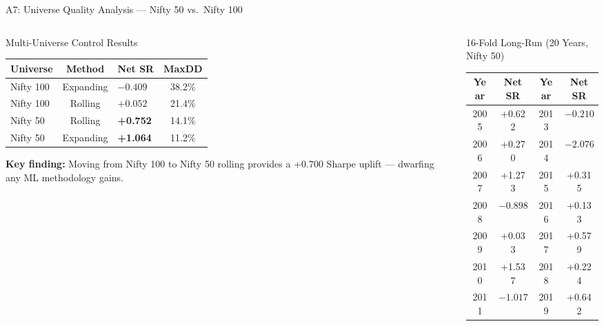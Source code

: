 \documentclass[aspectratio=169,10pt]{beamer}
\begin{document}
\begin{frame}{A7: Universe Quality Analysis --- Nifty 50 vs.\ Nifty 100}
  \begin{columns}[T]
    \begin{column}{0.50\textwidth}
      \begin{block}{Multi-Universe Control Results}
        \centering\scriptsize\renewcommand{\arraystretch}{1.3}
        \begin{tabular}{lclc}
          \toprule
          \textbf{Universe} & \textbf{Method} & \textbf{Net SR} & \textbf{MaxDD} \\
          \midrule
          Nifty 100 & Expanding & $-0.409$ & 38.2\% \\
          Nifty 100 & Rolling   & $+0.052$ & 21.4\% \\
          Nifty 50  & Rolling   & \color{goodgreen}\textbf{+0.752} & 14.1\% \\
          \rowcolor{hlrow}Nifty 50  & Expanding & \color{goodgreen}\textbf{+1.064} & 11.2\% \\
          \bottomrule
        \end{tabular}
      \end{block}
      \vspace{5pt}
      \small\textbf{Key finding:} Moving from Nifty 100 to Nifty 50 rolling provides a \alert{+0.700 Sharpe uplift} --- dwarfing any ML methodology gains.
    \end{column}
    \begin{column}{0.47\textwidth}
      \begin{block}{16-Fold Long-Run (20 Years, Nifty 50)}
        \centering\scriptsize\renewcommand{\arraystretch}{1.2}
        \begin{tabular}{cc|cc}
          \toprule
          \textbf{Year} & \textbf{Net SR} & \textbf{Year} & \textbf{Net SR} \\
          \midrule
          2005 & +0.622 & 2013 & $-0.210$ \\
          2006 & +0.270 & 2014 & $-2.076$ \\
          2007 & +1.273 & 2015 & +0.315 \\
          2008 & $-0.898$ & 2016 & +0.133 \\
          2009 & +0.033 & 2017 & +0.579 \\
          2010 & +1.537 & 2018 & +0.224 \\
          2011 & $-1.017$ & 2019 & +0.642 \\

\end{tabular}
\end{block}
\end{column}
\end{columns}
\end{frame}
\end{document}
